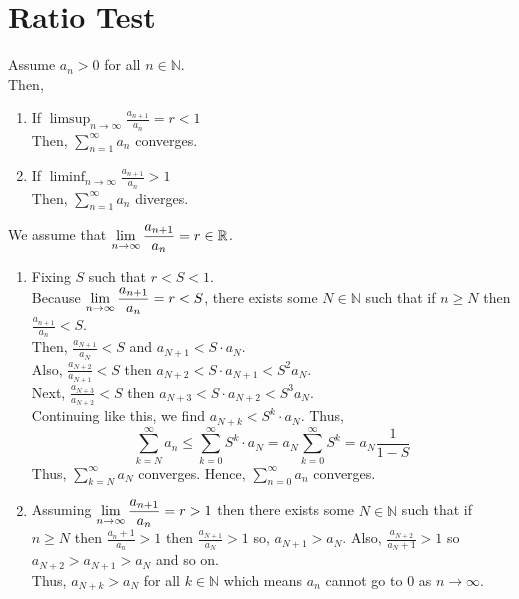 \documentclass[12pt]{article}
\begin{document}
\section{Ratio Test}
\begin{theo}{}
Assume \(a_n > 0\) for all \(n \in \mathbb N\).\\
Then, 
\begin{enumerate}
    \item If \(\displaystyle\limsup_{n\to\infty}\frac{a_{n+1}}{a_n} = r < 1\)\\
Then, \(\displaystyle\sum_{n=1}^\infty a_n\) converges.
    \item If \(\displaystyle\liminf_{n\to\infty} \frac{a_{n+1}}{a_n} > 1\)\\
Then, \(\displaystyle\sum_{n=1}^\infty a_n\) diverges.
\end{enumerate}
\end{theo}
\begin{prf}{}
We assume that \(\displaystyle\lim_{n\to\infty} \frac{a_{n+1}}{a_n} = r \in \mathbb R\).\\
\begin{enumerate}
    \item Fixing \(S\) such that \(r < S < 1\).\\
    Because \(\displaystyle\lim_{n\to\infty} \frac{a_{n+1}}{a_n} = r < S\), there exists some \(N \in \mathbb N\) such that if \(n \ge N\) then \(\frac{a_{n+1}}{a_n} < S\).\\
    Then, \(\frac{a_{N+1}}{a_N} < S\) and \(a_{N+1} < S\cdot a_N\).\\
    Also, \(\frac{a_{N+2}}{a_{N+1}} < S\) then \(a_{N+2} < S\cdot a_{N+1} < S^2 a_{N}\).\\
    Next, \(\frac{a_{N+3}}{a_{N+2}} < S\) then \(a_{N+3} < S\cdot a_{N+2} < S^3 a_{N}\).\\
    Continuing like this, we find \(a_{N+k} < S^k \cdot a_N\). Thus, \[\displaystyle\sum_{k=N}^\infty a_n \le \displaystyle\sum_{k=0}^\infty S^k\cdot a_N = a_N\displaystyle\sum_{k=0}^\infty S^k = a_N\frac{1}{1-S}\]
    Thus, \(\displaystyle\sum_{k=N}^\infty a_N\) converges. Hence, \(\displaystyle\sum_{n=0}^\infty a_n\) converges.
    \item Assuming \(\displaystyle\lim_{n\to\infty}\frac{a_{n+1}}{a_{n}} = r > 1\) then there exists some \(N \in \mathbb N\) such that if \(n \ge N\) then \(\frac{a_n+1}{a_n} > 1\) then \(\frac{a_{N+1}}{a_N} > 1\) so, \(a_{N+1} > a_N\). Also, \(\frac{a_{N+2}}{a_N+1} > 1\) so \(a_{N+2} > a_{N+1} > a_{N}\) and so on.\\
    Thus, \(a_{N+k} > a_{N}\) for all \(k \in \mathbb N\) which means \(a_n\) cannot go to \(0\) as \(n\to\infty\).
\end{enumerate}  
\end{prf}
\end{document}
